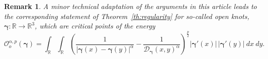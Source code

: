 \documentclass[a4paper,10pt,intlimits,ngerman]{amsart}
\newtheorem{definition}[theorem]{Definition}
\newtheorem{remark}[theorem]{Remark}
\numberwithin{equation}{section}
\newcommand{\R}{\mathbb{R}}
\newcommand{\Z}{\mathbb{Z}}
\newcommand{\sol}{{\boldsymbol{\gamma}}}
\newcommand{\brac}[1]{\left ( #1 \right )}
\newcommand{\eps}{\varepsilon}
\begin{document}
% 
% 
% 
% 

\begin{remark}
A minor technical adaptation of the arguments in this article leads  to the corresponding statement of Theorem~\ref{th:regularity} for so-called open knots, $\sol: \R \to \R^3$, which are critical points of the energy
\begin{equation}\label{eq:oharaenergiesnewo}
 \mathcal{O}^{\alpha,p}_o(\sol)= \int_{\R} \int_{\R} \brac{\frac{1}{|\sol(x) - \sol(y)|^\alpha} - \frac 1 {\mathcal{D}_\sol(x,y)^\alpha }}^{\frac{p}{2}} |\sol'(x)|\, |\sol'(y) |\ dx\ dy.
\end{equation}
\end{remark}
\end{document}
